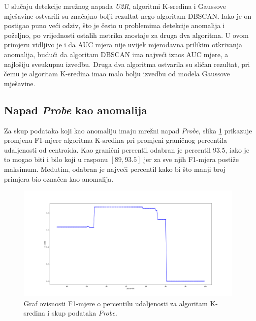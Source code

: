 \documentclass[utf8, diplomski, numeric]{fer}
\begin{document}
U slučaju detekcije mrežnog napada \textit{U2R}, algoritmi K-sredina i Gaussove mješavine ostvarili su značajno bolji rezultat nego algoritam DBSCAN. Iako je on postigao puno veći odziv, što je često u problemima detekcije anomalija i poželjno, po vrijednosti ostalih metrika zaostaje za druga dva algoritma. U ovom primjeru vidljivo je i da AUC mjera nije uvijek mjerodavna prilikim otkrivanja anomalija, budući da algoritam DBSCAN ima najveći iznos AUC mjere, a najlošiju sveukupnu izvedbu. Druga dva algoritma ostvarila su sličan rezultat, pri čemu je algoritam K-sredina imao malo bolju izvedbu od modela Gaussove mješavine.

\subsection{Napad \textit{Probe} kao anomalija}
Za skup podataka koji kao anomaliju imaju mrežni napad \textit{Probe}, slika \ref{fig:probe-kmeans} prikazuje promjenu F1-mjere algoritma K-sredina pri promjeni graničnog percentila udaljenosti od centroida. Kao granični percentil odabran je percentil 93.5, iako je to mogao biti i bilo koji u rasponu $[89, 93.5]$ jer za sve njih F1-mjera postiže maksimum. Međutim, odabran je najveći percentil kako bi što manji broj primjera bio označen kao anomalija.

\begin{figure}[h!]
\includegraphics[width=1\textwidth]{images/probe-kmeans-f1.png}
\centering
\caption{Graf ovisnosti F1-mjere o percentilu udaljenosti za algoritam K-sredina i skup podataka \textit{Probe}.}
\label{fig:probe-kmeans}
\end{figure}
\end{document}

